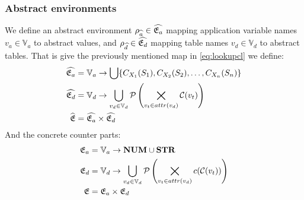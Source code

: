 \subsubsection{Abstract environments}

We define an abstract environment $\rho_{\widehat{a}} \in \widehat{\mathfrak{E}_a}$ mapping application variable names $v_a \in \mathbb{V}_a$ to abstract values, and $\rho_{\widehat{d}} \in \widehat{\mathfrak{E}_d}$ mapping table names $v_d \in \mathbb{V}_d$ to abstract tables.
That is give the previously mentioned map in \autoref{eq:lookupcl} we define:
\begin{align}
    \widehat{\mathfrak{E}_a} &= \mathbb{V}_a \rightarrow \bigcup \{ C_{X_1}(S_1), C_{X_2}(S_2), \dots, C_{X_n}(S_n) \} \\
    \widehat{\mathfrak{E}_d} &= \mathbb{V}_d \rightarrow \bigcup_{v_d \in \mathbb{V}_d} \mathcal{P}\left(\bigtimes_{v_t \in attr(v_d)}\mathcal{C}(v_t)\right) \\
    \widehat{\mathfrak{E}} &= \widehat{\mathfrak{E}_a} \times \widehat{\mathfrak{E}_d}
\end{align}
And the concrete counter parts:
\begin{align}
    \mathfrak{E}_a &= \mathbb{V}_a \rightarrow \mathbf{NUM} \cup \mathbf{STR} \\
    \mathfrak{E}_d &= \mathbb{V}_d \rightarrow \bigcup_{v_d \in \mathbb{V}_d} \mathcal{P}\left(\bigtimes_{v_t \in attr(v_d)}c(\mathcal{C}(v_t))\right) \\
    \mathfrak{E} &= \mathfrak{E}_a \times \mathfrak{E}_d
\end{align}

